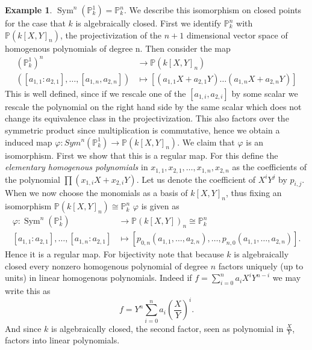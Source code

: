 \documentclass[11pt, a4paper, german, twoside]{article}
\theoremstyle{plain}
\theoremstyle{definition}
\newtheorem{example}[theorem]{Example}
\DeclareMathOperator{\Sym}{Sym}
\begin{document}
\begin{example}
    $\Sym^n(\mathbb{P}_k^1) = \mathbb{P}_k^n$. We describe this isomorphism on closed points for the case that $k$ is algebraically closed.
    First we identify $\mathbb{P}_k^n$ with $\mathbb{P}(k[X,Y]_n)$, the projectivization of the $n+1$ dimensional vector space of
    homogenous polynomials of degree n. Then consider the map
    \begin{align*}
        (\mathbb{P}_k^1)^n &\to \mathbb{P}(k[X,Y]_n)\\
        ([a_{1,1}:a_{2,1}],\dots,[a_{1,n},a_{2,n}]) &\mapsto [(a_{1,1}X + a_{2,1}Y)\dots(a_{1,n}X + a_{2,n}Y)]
    \end{align*}
    This is well defined, since if we rescale one of the $[a_{1,i},a_{2,i}]$ by some scalar we rescale the polynomial on the right hand side
    by the same scalar which does not change its equivalence class in the projectivization.
    This also factors over the symmetric product since multiplication is commutative, hence we obtain a induced map
    $\varphi \colon Sym^n(\mathbb{P}_k^1) \to \mathbb{P}(k[X,Y]_n)$. 
    We claim that $\varphi$ is an isomorphism. First we show that this is a regular map.
    For this define the \emph{elementary homogenous polynomials} in $x_{1,1},x_{2,1},\dots,x_{1,n},x_{2,n}$ as the coefficients of the polynomial
    $\prod (x_{1,i}X+ x_{2,i}Y)$. Let us denote the coefficient of $X^iY^j$ by $p_{i,j}$.
    When we now choose the monomials as a basis of $k[X,Y]_n$, thus fixing an isomorphism $\mathbb{P}(k[X,Y]_n) \cong \mathbb{P}_k^n$
    $\varphi$ is given as
    \begin{align*}
        \varphi \colon \Sym^n(\mathbb{P}_k^1) &\to \mathbb{P}(k[X,Y])_n \cong \mathbb{P}_k^n\\
        [a_{1,1}:a_{2,1}],\dots,[a_{1,n}:a_{2,1}] &\mapsto [p_{0,n}(a_{1,1},\dots, a_{2,n}),\dots,p_{n,0}(a_{1,1},\dots, a_{2,n})].
    \end{align*}
    Hence it is a regular map.
    For bijectivity note that because $k$ is algebraically closed every nonzero homogenous polynomial of degree $n$ factors uniquely (up to
    units) in linear homogenous polynomials.
    Indeed if $f = \sum_{i=0}^n a_iX^iY^{n-i}$ we may write this as
    \[
        f = Y^n \sum_{i=0}^n a_i\left(\frac{X}{Y}\right)^i.
    \]
    And since $k$ is algebraically closed, the second factor, seen as polynomial in $\frac{X}{Y}$, factors into linear polynomials.
\end{example}
\end{document}
